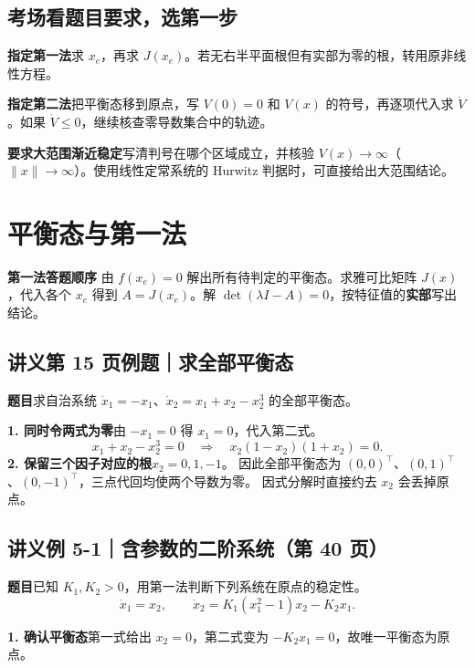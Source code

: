 \documentclass[UTF8,a4paper,11pt,fontset=fandol]{ctexart}
\begin{document}
\subsection*{考场看题目要求，选第一步}
\begin{keybox}
\textbf{指定第一法}\quad 求 $x_e$，再求 $J(x_e)$。若无右半平面根但有实部为零的根，转用原非线性方程。

\textbf{指定第二法}\quad 把平衡态移到原点，写 $V(0)=0$ 和 $V(x)$ 的符号，再逐项代入求 $\dot V$。如果 $\dot V\le0$，继续核查零导数集合中的轨迹。

\textbf{要求大范围渐近稳定}\quad 写清判号在哪个区域成立，并核验 $V(x)\to\infty$（$\|x\|\to\infty$）。使用线性定常系统的 Hurwitz 判据时，可直接给出大范围结论。
\end{keybox}

\newpage
\section{平衡态与第一法}\label{sec:first}

\begin{keybox}
\textbf{第一法答题顺序}\quad
由 $f(x_e)=0$ 解出所有待判定的平衡态。求雅可比矩阵 $J(x)$，代入各个 $x_e$ 得到 $A=J(x_e)$。解 $\det(\lambda I-A)=0$，按特征值的\textbf{实部}写出结论。
\end{keybox}

\subsection*{讲义第 15 页例题｜求全部平衡态}

\textbf{题目}\quad 求自治系统 $\dot x_1=-x_1$、$\dot x_2=x_1+x_2-x_2^3$ 的全部平衡态。

\textbf{1. 同时令两式为零}\quad 由 $-x_1=0$ 得 $x_1=0$，代入第二式。
\[
  x_1+x_2-x_2^3=0\quad\Longrightarrow\quad
  x_2(1-x_2)(1+x_2)=0.
\]
\textbf{2. 保留三个因子对应的根}\quad $x_2=0,1,-1$。
因此全部平衡态为 $(0,0)^\top$、$(0,1)^\top$、$(0,-1)^\top$，三点代回均使两个导数为零。
因式分解时直接约去 $x_2$ 会丢掉原点。

\subsection*{讲义例 5-1｜含参数的二阶系统（第 40 页）}

\textbf{题目}\quad 已知 $K_1,K_2>0$，用第一法判断下列系统在原点的稳定性。
\[
  \dot x_1=x_2,\qquad \dot x_2=K_1(x_1^2-1)x_2-K_2x_1.
\]

\textbf{1. 确认平衡态}\quad 第一式给出 $x_2=0$，第二式变为 $-K_2x_1=0$，故唯一平衡态为原点。
\end{document}
